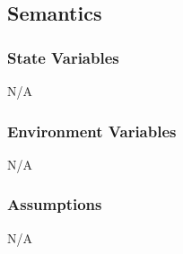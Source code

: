 \documentclass[12pt, titlepage]{article}
\begin{document}
\subsection{Semantics}

\subsubsection{State Variables}
N/A

\subsubsection{Environment Variables}
N/A

\subsubsection{Assumptions}
N/A
\end{document}
